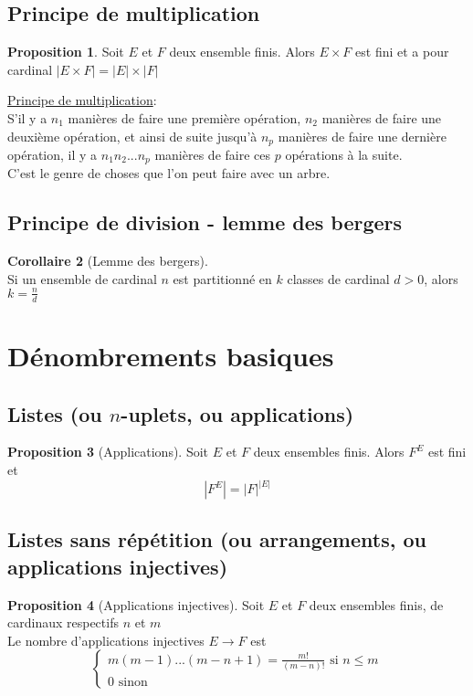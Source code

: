 \documentclass[10pt,a4paper]{article}
\theoremstyle{definition}
\newtheorem{proposition}{Proposition}[section]
\newtheorem{corollaire}[proposition]{Corollaire}
\begin{document}
\subsection{Principe de multiplication}
\begin{proposition}
Soit $E$ et $F$ deux ensemble finis. Alors $E \times F$ est fini et a pour cardinal $|E \times F| = |E| \times |F|$
\end{proposition}
\noindent \uline{Principe de multiplication}: \\
S'il y a $n_1$ manières de faire une première opération, $n_2$ manières de faire une deuxième opération, et ainsi de suite jusqu'à $n_p$ manières de faire une dernière opération, il y a $n_1 n_2 ... n_p$ manières de faire ces $p$ opérations à la suite. \\
C'est le genre de choses que l'on peut faire avec un arbre.

\subsection{Principe de division - lemme des bergers}
\begin{corollaire}[Lemme des bergers]
\hfill \\
Si un ensemble de cardinal $n$ est partitionné en $k$ classes de cardinal $d > 0$, alors $k = \frac{n}{d}$
\end{corollaire}

\section{Dénombrements basiques}
\subsection{Listes (ou $n$-uplets, ou applications)}
\begin{proposition}[Applications]
Soit $E$ et $F$ deux ensembles finis. Alors $F^E$ est fini et
\[ \left| F^E \right| = |F|^{|E|} \]
\end{proposition}

\subsection{Listes sans répétition (ou arrangements, ou applications injectives)}
\begin{proposition}[Applications injectives]
Soit $E$ et $F$ deux ensembles finis, de cardinaux respectifs $n$ et $m$ \\
Le nombre d'applications injectives $E \to F$ est
\[ \begin{cases}
m(m - 1) ... (m - n + 1) = \frac{m!}{(m - n)!} \text{ si } n \leq m \\
0 \text{ sinon }
\end{cases} \]
\end{proposition}
\end{document}

